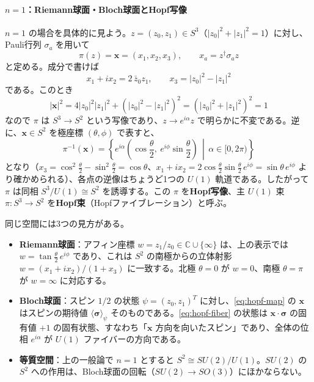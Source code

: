 \documentclass[uplatex, dvipdfmx, book]{jsbook}
\begin{document}
\paragraph{$n = 1$：Riemann球面・Bloch球面とHopf写像}
$n = 1$ の場合を具体的に見よう。$z = (z_0, z_1) \in S^3$（$|z_0|^2 + |z_1|^2 = 1$）に対し、Pauli行列 $\sigma_a$ を用いて
\begin{equation}
    \pi(z) = \bm{x} = (x_1, x_2, x_3), \qquad x_a = z^\dagger \sigma_a z
    \label{eq:hopf-map}
\end{equation}
と定める。成分で書けば
\begin{equation}
    x_1 + i x_2 = 2\,\bar{z}_0 z_1, \qquad x_3 = |z_0|^2 - |z_1|^2
\end{equation}
である。このとき
\begin{equation}
    |\bm{x}|^2 = 4|z_0|^2|z_1|^2 + \left( |z_0|^2 - |z_1|^2 \right)^2 = \left( |z_0|^2 + |z_1|^2 \right)^2 = 1
\end{equation}
なので $\pi$ は $S^3 \to S^2$ という写像であり、$z \to e^{i\alpha}z$ で明らかに不変である。逆に、$\bm{x} \in S^2$ を極座標 $(\theta, \phi)$ で表すと、
\begin{equation}
    \pi^{-1}(\bm{x}) = \left\{ e^{i\alpha} \left( \cos\frac{\theta}{2},\ e^{i\phi}\sin\frac{\theta}{2} \right) \,\middle|\, \alpha \in [0, 2\pi) \right\}
    \label{eq:hopf-fiber}
\end{equation}
となり（$x_3 = \cos^2\frac{\theta}{2} - \sin^2\frac{\theta}{2} = \cos\theta$、$x_1 + ix_2 = 2\cos\frac{\theta}{2}\sin\frac{\theta}{2}\,e^{i\phi} = \sin\theta\, e^{i\phi}$ より確かめられる）、各点の逆像はちょうど1つの $U(1)$ 軌道である。したがって $\pi$ は同相 $S^3/U(1) \cong S^2$ を誘導する。この $\pi$ を\textbf{Hopf写像}、主 $U(1)$ 束 $\pi : S^3 \to S^2$ を\textbf{Hopf束}（Hopfファイブレーション）と呼ぶ。

同じ空間には3つの見方がある。
\begin{itemize}
    \item \textbf{Riemann球面}：アフィン座標 $w = z_1/z_0 \in \mathbb{C} \cup \{\infty\}$ は、上の表示では $w = \tan\frac{\theta}{2}\, e^{i\phi}$ であり、これは $S^2$ の南極からの立体射影 $w = (x_1 + ix_2)/(1 + x_3)$ に一致する。北極 $\theta = 0$ が $w = 0$、南極 $\theta = \pi$ が $w = \infty$ に対応する。
    \item \textbf{Bloch球面}：スピン $1/2$ の状態 $\psi = (z_0, z_1)^T$ に対し、\eqref{eq:hopf-map} の $\bm{x}$ はスピンの期待値 $\langle \bm{\sigma} \rangle_\psi$ そのものである。\eqref{eq:hopf-fiber} の状態は $\bm{x} \cdot \bm{\sigma}$ の固有値 $+1$ の固有状態、すなわち「$\bm{x}$ 方向を向いたスピン」であり、全体の位相 $e^{i\alpha}$ が $U(1)$ ファイバーの方向である。
    \item \textbf{等質空間}：上の一般論で $n = 1$ とすると $S^2 \cong SU(2)/U(1)$。$SU(2)$ の $S^2$ への作用は、Bloch球面の回転（$SU(2) \to SO(3)$）にほかならない。
\end{itemize}
\end{document}
